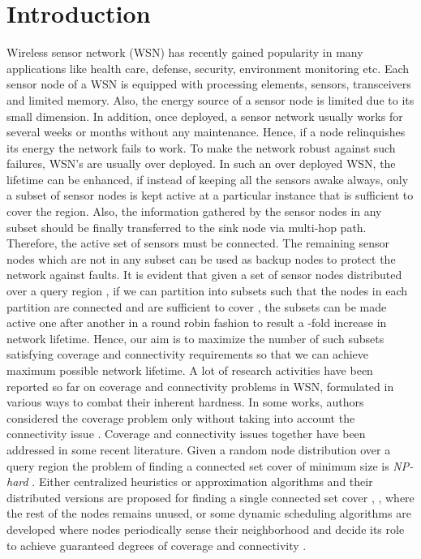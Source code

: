 \documentclass{acm_proc_article-sp}
\begin{document}
\section{Introduction}
\label{sec_1}
Wireless sensor network (WSN) has recently gained popularity in many applications like health care, defense, security, environment monitoring etc. Each sensor node of a WSN is equipped with processing elements, sensors, transceivers and limited memory. Also, the energy source of a sensor node is limited due to its small dimension. In addition, once deployed, a sensor network usually works for several weeks or months without any maintenance. Hence, if a node relinquishes its energy the network fails to work. To make the network robust against such failures, WSN's are usually over deployed. In such an over deployed WSN, the lifetime can be enhanced, if instead of keeping all the sensors awake always, only a subset of sensor nodes is kept active at a particular instance that is sufficient to cover the region. Also, the information gathered by the sensor nodes in any subset should be finally transferred to the sink node via multi-hop path. Therefore, the active set of sensors must be connected. The remaining 
sensor nodes which are not in any subset can be used as backup nodes to protect the network against faults. It is evident that given a set  of sensor nodes distributed over a query region , if we can partition  into  subsets such that the nodes in each partition are connected and are sufficient to cover , the subsets can be made active one after another in a round robin fashion to result a -fold increase in network lifetime. Hence, our aim is to maximize the number of such subsets satisfying coverage and connectivity requirements so that  we can achieve maximum possible network lifetime.
A lot of research activities have been reported so far on coverage and connectivity problems in WSN, formulated in various ways to combat their inherent hardness. In some works, authors considered the coverage problem only without taking into account the connectivity issue \cite{Zabrams, Huang,Meguerdichian, SSlij,Demin}. Coverage and connectivity issues together have been addressed in some recent literature. Given a random node distribution over a query region the problem of finding a connected set cover of minimum size is {\it NP-hard} \cite{Wang}. Either centralized heuristics or approximation algorithms and their distributed versions are proposed for finding a single connected set cover \cite{Himangsu}, \cite{Zhou}, where the rest of the nodes remains unused, or some dynamic scheduling algorithms are developed where nodes periodically sense their neighborhood and decide its role to achieve guaranteed degrees of coverage and connectivity \cite{Gallais,Lin,Chong,Tian,Wang,yan}.\\
\end{document}
